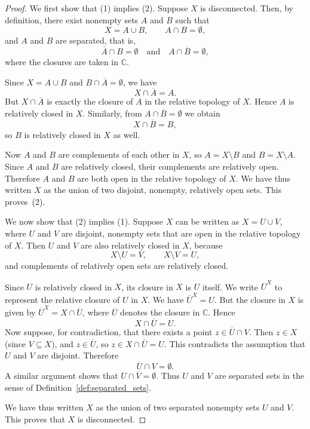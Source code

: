 \begin{proof}
	We first show that (1) implies (2). Suppose $X$ is disconnected. Then, by definition, there exist
	nonempty sets $A$ and $B$ such that
	\[
	X = A \cup B,\qquad A\cap B = \emptyset,
	\]
	and $A$ and $B$ are separated, that is,
	\[
	\overline{A}\cap B = \emptyset
	\quad\text{and}\quad
	A\cap \overline{B} = \emptyset,
	\]
	where the closures are taken in $\mathbb{C}$.
	
	Since $X = A\cup B$ and $B\cap \overline{A} = \emptyset$, we have
	\[
	X\cap \overline{A} = A.
	\]
	But $X\cap \overline{A}$ is exactly the closure of $A$ in the relative topology of $X$. Hence
	$A$ is relatively closed in $X$. Similarly, from $A\cap \overline{B} = \emptyset$ we obtain
	\[
	X\cap \overline{B} = B,
	\]
	so $B$ is relatively closed in $X$ as well.
	
	Now $A$ and $B$ are complements of each other in $X$, so $A = X\setminus B$ and $B = X\setminus A$.
	Since $A$ and $B$ are relatively closed, their complements are relatively open. Therefore $A$ and
	$B$ are both open in the relative topology of $X$. We have thus written $X$ as the union of two
	disjoint, nonempty, relatively open sets. This proves~(2).
	
	\medskip
	
	We now show that (2) implies (1). Suppose $X$ can be written as
$	X = U \cup V$,
	where $U$ and $V$ are disjoint, nonempty sets that are open in the relative topology of $X$.
	Then $U$ and $V$ are also relatively closed in $X$, because
	\[
	X\setminus U = V, \qquad X\setminus V = U,
	\]
	and complements of relatively open sets are relatively closed.
	
	Since $U$ is relatively closed in $X$, its closure in $X$ is $U$ itself. We write $\overline{U}^X$ to represent the relative closure of $U$ in $X$. We have $\overline{U}^X = U$. But the closure in $X$ is given by $\overline{U}^X = X\cap \overline{U}$, where $\overline{U}$
	denotes the closure in $\mathbb{C}$. Hence
	\[
	X\cap \overline{U} = U.
	\]
	Now suppose, for contradiction, that there exists a point $z\in \overline{U}\cap V$. Then
	$z\in X$ (since $V\subseteq X$), and $z\in \overline{U}$, so $z\in X\cap \overline{U} = U$.
	This contradicts the assumption that $U$ and $V$ are disjoint. Therefore
	\[
	\overline{U}\cap V = \emptyset.
	\]
	A similar argument shows that $U\cap \overline{V} = \emptyset$. Thus $U$ and $V$ are separated
	sets in the sense of Definition~\ref{def:separated_sets}.
	
	We have thus written $X$ as the union of two separated nonempty sets $U$ and $V$. This proves that $X$ is disconnected.
\end{proof}


